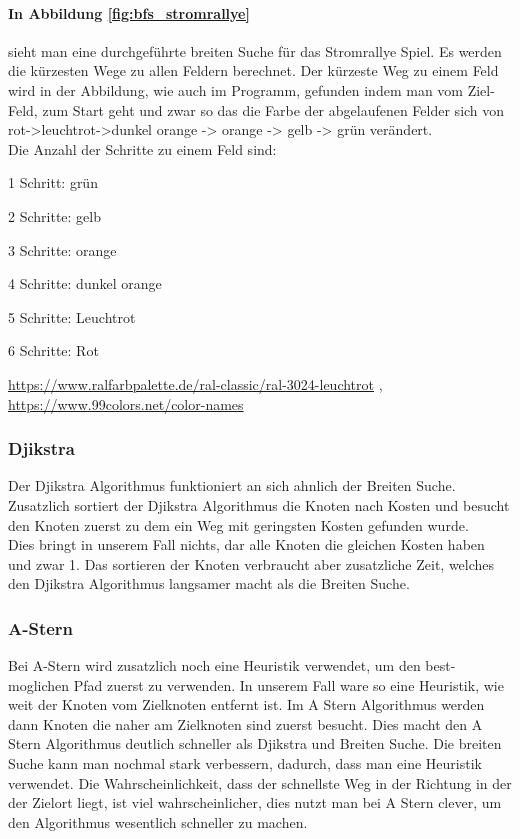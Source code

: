 \documentclass[a4paper,12pt,arial]{scrartcl}
\begin{document}
\paragraph{In Abbildung \ref{fig:bfs_stromrallye}}
 sieht man eine durchgeführte breiten Suche für das Stromrallye Spiel. Es werden die kürzesten Wege zu allen Feldern berechnet. Der kürzeste Weg zu einem Feld wird in der Abbildung, wie auch im Programm, gefunden indem man vom Ziel-Feld, zum Start geht und zwar so das die Farbe der abgelaufenen Felder sich von rot->leuchtrot->dunkel orange -> orange -> gelb -> grün verändert.
\setlength{\itemsep}{-60pt}
\\
Die Anzahl der Schritte zu einem Feld sind:
\small
\begin{compactitem}
\item 1 Schritt: grün
\item 2 Schritte: gelb
\item 3 Schritte: orange
\item 4 Schritte: dunkel orange
\item 5 Schritte: Leuchtrot
\item 6 Schritte: Rot
\end{compactitem}
\tiny{ \url{https://www.ralfarbpalette.de/ral-classic/ral-3024-leuchtrot}}  , \tiny{\url{https://www.99colors.net/color-names}}
\normalsize
\subsubsection{Djikstra}
Der Djikstra Algorithmus funktioniert an sich ahnlich der Breiten Suche. Zusatzlich sortiert der Djikstra Algorithmus die Knoten nach Kosten und besucht den Knoten zuerst zu dem ein Weg mit geringsten Kosten gefunden wurde.
\\
Dies bringt in unserem Fall nichts, dar alle Knoten die gleichen Kosten haben und zwar 1. Das sortieren der Knoten verbraucht aber zusatzliche Zeit, welches den Djikstra Algorithmus langsamer macht als die Breiten Suche.
\subsubsection{A-Stern}
Bei A-Stern wird zusatzlich noch eine Heuristik verwendet, um den best-moglichen Pfad zuerst zu verwenden.
In unserem Fall ware so eine Heuristik, wie weit der Knoten vom Zielknoten entfernt ist. 
Im A Stern Algorithmus werden dann Knoten die naher am Zielknoten sind zuerst besucht.
Dies macht den A Stern Algorithmus deutlich schneller als Djikstra und Breiten Suche.
Die breiten Suche kann man nochmal stark verbessern, dadurch, dass man eine Heuristik verwendet.
Die Wahrscheinlichkeit, dass der schnellste Weg in der Richtung in der der Zielort liegt, ist viel wahrscheinlicher, dies nutzt man bei A Stern clever, um den Algorithmus wesentlich schneller zu machen.
\end{document}
